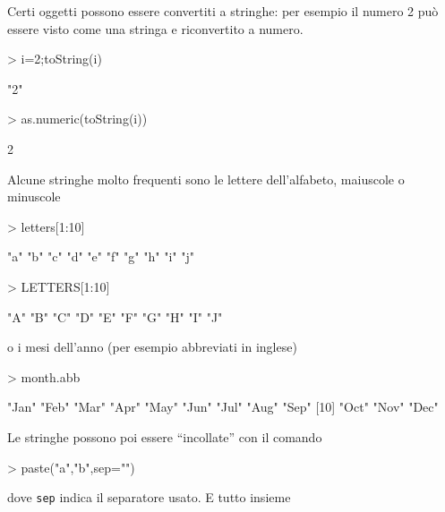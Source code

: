 \documentclass[onecolumn,12pt]{book}
\begin{document}
Certi oggetti possono essere convertiti a stringhe: per esempio il numero 2 pu\`o essere visto come una stringa e riconvertito a numero.
\begin{Schunk}
\begin{Sinput}
>  i=2;toString(i)
\end{Sinput}
\begin{Soutput}
[1] "2"
\end{Soutput}
\begin{Sinput}
> as.numeric(toString(i))
\end{Sinput}
\begin{Soutput}
[1] 2
\end{Soutput}
\end{Schunk}
Alcune stringhe molto frequenti sono le lettere  dell'alfabeto, maiuscole o minuscole
\begin{Schunk}
\begin{Sinput}
> letters[1:10]
\end{Sinput}
\begin{Soutput}
 [1] "a" "b" "c" "d" "e" "f" "g" "h" "i" "j"
\end{Soutput}
\begin{Sinput}
> LETTERS[1:10]
\end{Sinput}
\begin{Soutput}
 [1] "A" "B" "C" "D" "E" "F" "G" "H" "I" "J"
\end{Soutput}
\end{Schunk}
o i mesi dell'anno (per esempio abbreviati in inglese)
\begin{Schunk}
\begin{Sinput}
> month.abb
\end{Sinput}
\begin{Soutput}
 [1] "Jan" "Feb" "Mar" "Apr" "May" "Jun" "Jul" "Aug" "Sep"
[10] "Oct" "Nov" "Dec"
\end{Soutput}
\end{Schunk}
Le stringhe possono poi essere ``incollate'' con il comando
\begin{Schunk}
\begin{Sinput}
> paste("a","b",sep="")
\end{Sinput}
\end{Schunk}
dove \texttt{sep}  indica il separatore usato.
E tutto insieme
\end{document}
